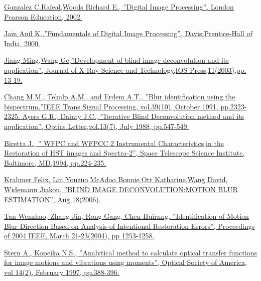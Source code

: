 \documentclass{article}
\begin{document}
\clearpage
\begin{thebibliography}{9}

\href{https://www.pearson.com/us/higher-education/program/Gonzalez-Digital-Image-Processing-4th-Edition/PGM241219.html}{Gonzalez C.Rafeal,Woods Richard E., ”Digital Image Processing”, London Pearson Education, 2002. }

\href{https://dl.acm.org/doi/book/10.5555/59921}{Jain Anil K.,”Fundamentals of Digital Image Processing”, Davis:Prentice-Hall of India, 2000.}

\href{https://www.ijccer.org/index.php/ojs/article/view/115}{Jiang Ming,Wang Ge,”Development of blind image deconvolution and its application”, Journal of X-Ray Science and Technology,IOS Press,11(2003),pp. 13-19.  }

\href{https://baixardoc.com/documents/digital-image-processing-4th-edition-william-k-pratt-edwara--5d0a9c64c59cd}{Chang M.M., Tekalp A.M., and Erdem A.T., ”Blur identification using the bispectrum,”IEEE Trans Signal Processing, vol.39(10), October 1991, pp.2323-2325. Ayers G.R., Dainty J.C., ”Iterative Blind Deconvolution method and its application”, Optics Letter,vol.13(7), July 1988, pp.547-549.}

\href{https://www.academia.edu/8030569/DEBLURRING_OF_IMAGES_USING_BLIND_SCHEMES}{Biretta J., ” WFPC and WFPCC 2 Instrumental Characteristics,in the Restoration of HST images and Spectra-2”, Space Telescope Science Institute, Baltimore, MD,1994, pp.224-235. }

\href{https://www.ima.umn.edu/materials/2005-2006/MM8.9-18.06/1590/team5_rep.pdf}{Krahmer Felix, Lin Youzuo,McAdoo Bonnie,Ott Katharine,Wang David, Widemann Jiakou, ”BLIND IMAGE DECONVOLUTION:MOTION BLUR ESTIMATION”, Aug 18(2006).}

\href{https://www.academia.edu/8030569/DEBLURRING_OF_IMAGES_USING_BLIND_SCHEMES}{Tan Wenzhao, Zhang Jin, Rong Gang, Chen Huirnng, ”Identification of Motion Blur Direction Based on Analysis of Intentional Restoration Errors”, Proceedings of 2004 IEEE, March 21-23(2004), pp 1253-1258. }

\href{https://www.academia.edu/8030569/DEBLURRING_OF_IMAGES_USING_BLIND_SCHEMES}{Stern A., Kopeika N.S., ”Analytical method to calculate optical transfer functions for image motions and vibrations using moments”, Optical Society of America, vol 14(2), February 1997, pp.388-396.}


\end{thebibliography}
\end{document}
